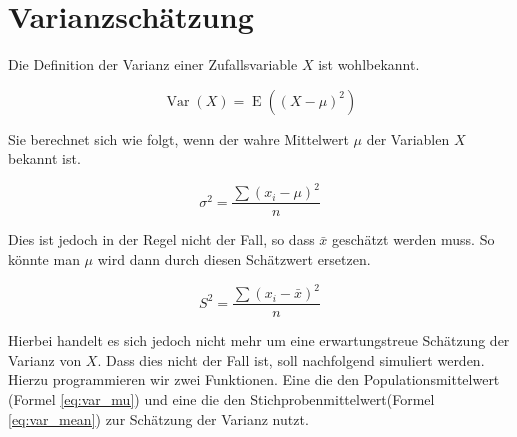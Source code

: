 
\renewenvironment{Schunk}{\vspace{10pt}}{\vspace{8pt}}   


\section{Varianzschätzung}

Die Definition der Varianz einer Zufallsvariable $X$ ist wohlbekannt. 

\begin{equation}
\operatorname{Var}(X) = \operatorname{E}\left( (X-\mu)^2\right)  
\end{equation}  

Sie berechnet sich wie folgt, wenn der wahre Mittelwert $\mu$ der Variablen $X$ bekannt ist. 

\begin{equation} \label{eq:var_mu}
  \sigma^2 = \frac{\sum{(x_i - \mu)^2}}{n}  
\end{equation}

Dies ist jedoch in der Regel nicht der Fall, so dass $\bar x$ geschätzt werden muss. So könnte man $\mu$ wird dann durch diesen Schätzwert ersetzen.

\begin{equation} \label{eq:var_mean}
  S^2 = \frac{\sum{(x_i - \bar x)^2}}{n}  
\end{equation} 

Hierbei handelt es sich jedoch nicht mehr um eine erwartungstreue Schätzung der Varianz von $X$. Dass dies nicht der Fall ist, soll nachfolgend simuliert werden. Hierzu programmieren wir zwei Funktionen. Eine die den Populationsmittelwert (Formel \ref{eq:var_mu}) und eine die den Stichprobenmittelwert(Formel \ref{eq:var_mean}) zur Schätzung der Varianz nutzt.  


